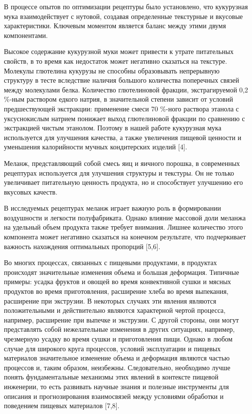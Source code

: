 В процессе опытов по оптимизации рецептуры было установлено, что
кукурузная мука взаимодействует с нутовой, создавая определенные
текстурные и вкусовые характеристики. Ключевым моментом является баланс
между этими двумя компонентами.

Высокое содержание кукурузной муки может привести к утрате питательных
свойств, в то время как недостаток может негативно сказаться на
текстуре. Молекулы глютелина кукурузы не способны образовывать
непрерывную структуру в тесте вследствие наличия большого количества
поперечных связей между молекулами белка. Количество глютелиновой
фракции, экстрагируемой 0,2 \%-ным раствором едкого натрия, в
значительной степени зависит от условий предшествующей экстракции:
применение смеси 70 \%-ного раствора этанола с уксуснокислым натрием
понижает выход глютелиновой фракции по сравнению с экстракцией чистым
этанолом. Поэтому в нашей работе кукурузная мука используется для
улучшения качества, а также увеличения пищевой ценности и уменьшения
калорийности мучных кондитерских изделий {[}4{]}.

Меланж, представляющий собой смесь яиц и яичного порошка, в современных
рецептурах используется для улучшения структуры и текстуры. Он не только
увеличивает питательную ценность продукта, но и способствует улучшению
его вкусовых качеств.

В исследуемых рецептурах меланж играет важную роль в формировании
воздушности и легкости полуфабриката. Однако влияние массовой доли
меланжа на удельный объем продукта также требует внимания. Лишнее
количество этого компонента может негативно сказаться на конечном
результате, что подчеркивает важность нахождения оптимальных пропорций
{[}5,6{]}.

Во многих процессах, связанных с пищевыми продуктами, в продуктах
происходят значительные изменения объема и большая деформация. Типичные
примеры: усадка фруктов и овощей во время конвективной сушки и мясных
продуктов во время приготовления, расширение хлеба во время выпекания,
расширение при экструзии. В некоторых случаях эти явления являются
положительными и действительно являются характерной чертой процесса,
например, расширение при выпечке и экструзии. С другой стороны, они
могут представлять собой нежелательные изменения в других ситуациях,
например, чрезмерную усадку во время сушки и приготовления пищи. Однако
в любом случае для широкого круга процессов, условий эксплуатации и
пищевых материалов значительное изменение объема и деформация являются
частью процессов и, таким образом, неизбежны. Следовательно, необходимо
лучше понять фундаментальные механизмы этих явлений в контексте пищевой
инженерии, то есть развивать научные знания и полезные инструменты для
описания и прогнозирования взаимосвязей между условиями обработки и
поведением пищевых материалов {[}7,8{]}.

